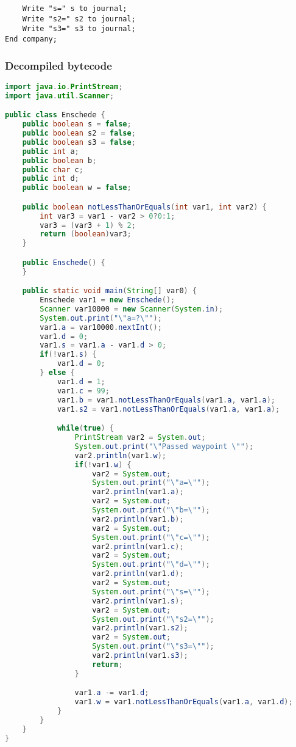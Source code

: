 \begin{landscape}
\begin{lstlisting}
    Write "s=" s to journal;
    Write "s2=" s2 to journal;
    Write "s3=" s3 to journal;
End company;
\end{lstlisting}

\subsubsection*{Decompiled bytecode}

\begin{lstlisting}[language=Java]
import java.io.PrintStream;
import java.util.Scanner;

public class Enschede {
    public boolean s = false;
    public boolean s2 = false;
    public boolean s3 = false;
    public int a;
    public boolean b;
    public char c;
    public int d;
    public boolean w = false;

    public boolean notLessThanOrEquals(int var1, int var2) {
        int var3 = var1 - var2 > 0?0:1;
        var3 = (var3 + 1) % 2;
        return (boolean)var3;
    }

    public Enschede() {
    }

    public static void main(String[] var0) {
        Enschede var1 = new Enschede();
        Scanner var10000 = new Scanner(System.in);
        System.out.print("\"a=?\"");
        var1.a = var10000.nextInt();
        var1.d = 0;
        var1.s = var1.a - var1.d > 0;
        if(!var1.s) {
            var1.d = 0;
        } else {
            var1.d = 1;
            var1.c = 99;
            var1.b = var1.notLessThanOrEquals(var1.a, var1.a);
            var1.s2 = var1.notLessThanOrEquals(var1.a, var1.a);

            while(true) {
                PrintStream var2 = System.out;
                System.out.print("\"Passed waypoint \"");
                var2.println(var1.w);
                if(!var1.w) {
                    var2 = System.out;
                    System.out.print("\"a=\"");
                    var2.println(var1.a);
                    var2 = System.out;
                    System.out.print("\"b=\"");
                    var2.println(var1.b);
                    var2 = System.out;
                    System.out.print("\"c=\"");
                    var2.println(var1.c);
                    var2 = System.out;
                    System.out.print("\"d=\"");
                    var2.println(var1.d);
                    var2 = System.out;
                    System.out.print("\"s=\"");
                    var2.println(var1.s);
                    var2 = System.out;
                    System.out.print("\"s2=\"");
                    var2.println(var1.s2);
                    var2 = System.out;
                    System.out.print("\"s3=\"");
                    var2.println(var1.s3);
                    return;
                }

                var1.a -= var1.d;
                var1.w = var1.notLessThanOrEquals(var1.a, var1.d);
            }
        }
    }
}
\end{lstlisting}
\end{landscape}
